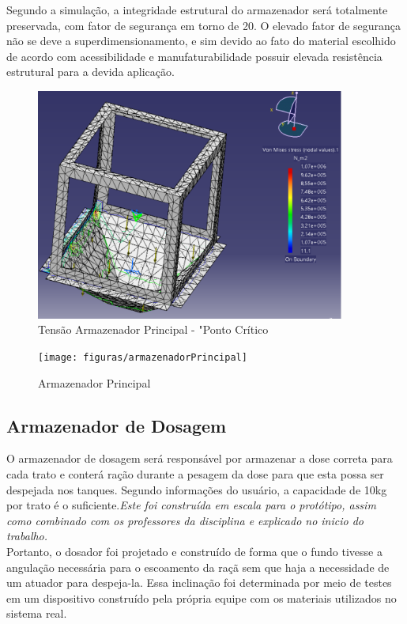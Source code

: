 Segundo a simula\c{c}\~{a}o, a integridade estrutural do armazenador ser\'{a} totalmente preservada, com fator de seguran\c{c}a  em torno de 20. O elevado fator de seguran\c{c}a n\~{a}o se deve a superdimensionamento, e sim devido ao fato do material escolhido de acordo com acessibilidade e manufaturabilidade possuir elevada resist\^{e}ncia estrutural para a devida aplica\c{c}\~{a}o.

\begin{figure}[h]
  \centering
  \includegraphics[width=4in]{figuras/Armazenador_Tensao}
  \caption{Tens\~{a}o Armazenador Principal - "Ponto Cr\'{i}tico}
\end{figure}

\begin{figure}[h]
\centering
\texttt{[image: figuras/armazenadorPrincipal]}
\caption{Armazenador Principal}
\end{figure}

\subsection{Armazenador de Dosagem}
O armazenador de dosagem ser\'{a} respons\'{a}vel por armazenar a dose correta para cada trato e conter\'{a} ra\c{c}\~{a}o durante a pesagem da dose para que esta possa ser despejada nos tanques. Segundo informa\c{c}\~{o}es do usu\'{a}rio, a capacidade de 10kg por trato \'{e} o suficiente.\textit{Este foi constru\'{i}da em escala para o prot\'{o}tipo, assim como combinado com os professores da disciplina e explicado no inicio do trabalho.} \\


Portanto, o dosador foi projetado e constru\'{i}do de forma que o fundo tivesse a angula\c{c}\~{a}o necess\'{a}ria para o escoamento da ra\c{c}\~{a} sem que haja a necessidade de um atuador para despeja-la. Essa inclina\c{c}\~{a}o foi determinada por meio de testes em um dispositivo constru\'{i}do pela pr\'{o}pria equipe com os materiais utilizados no sistema real. \\



